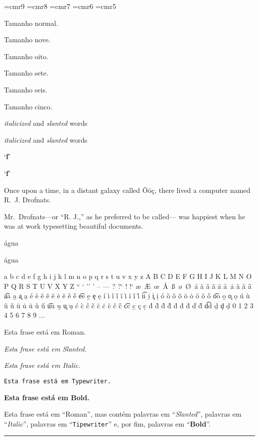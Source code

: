 \font\tamanhonove=cmr9
\font\tamanhooito=cmr8
\font\tamanhosete=cmr7
\font\tamanhoseis=cmr6
\font\tamanhocinco=cmr5



Tamanho normal.

{\tamanhonove Tamanho nove.}

{\tamanhooito Tamanho oito.}

{\tamanhosete Tamanho sete.}

{\tamanhoseis Tamanho seis.}

{\tamanhocinco Tamanho cinco.}

{\it italicized} and {\sl slanted} words

{\it italicized\/} and {\sl slanted\/} words

`{\bf f}'

`{\bf f\/}'



Once upon a time, in a distant
galaxy called \"O\"o\c c,
there lived a computer
named R.~J. Drofnats.

Mr.~Drofnats---or ``R. J.,'' as
he preferred to be called---
was happiest when he was at work
typesetting beautiful documents.

\'agua

\' agua

\noindent a b c d e f g h i j k l m n o p q r s t u v x y z
A B C D E F G H I J K L M N O P Q R S T U V X Y Z
`` ` '' ' -- --- ? ?` ! !` \ae\ \AE\ \oe\ \AA\ \ss\ 
\o\ \O\ \'a \`a \^a \~a \"a \aa\ \.a \u{a} \v{a} \H{a} \t{aa} \b{a} \c{a} \d{a}
\'e \`e \^e \~e \"e \.e \u{e} \v{e} \H{e} \t{ee} \b{e} \c{e} \d{e}
\'i \`i \^i \~i \"i \.i \u{i} \v{i} \H{i} \t{ii} \b{i} \c{i} \d{i}
\'o \`o \^o \~o \"o \.o \u{o} \v{o} \H{o} \t{oo} \b{o} \c{o} \d{o}
\'u \`u \^u \~u \"u \.u \u{u} \v{u} \H{u} \t{uu} \b{u} \c{u} \d{u}
\'c \`c \^c \~c \"c \.c \u{c} \v{c} \H{c} \t{cc} \b{c} \c{c} \d{c}
\'d \`d \^d \~d \"d \.d \u{d} \v{d} \H{d} \t{dd} \b{d} \c{d} \d{d}
0 1 2 3 4 5 6 7 8 9 $\ldots$


{\rm Esta frase est\'a em Roman.}

{\sl Esta frase est\'a em Slanted.}

{\it Esta frase est\'a em Italic.}

{\tt Esta frase est\'a em Typewriter.}

{\bf Esta frase est\'a em Bold.}

\noindent
Esta frase est\'a em ``Roman'', mas cont\'em palavras em ``{\sl Slanted\/}'',
palavras em ``{\it Italic\/}'', palavras em ``{\tt Tipewriter\/}'' e, por fim,
palavras em ``{\bf Bold\/}''.

\vskip 1in
\hrule
\vfill\eject
